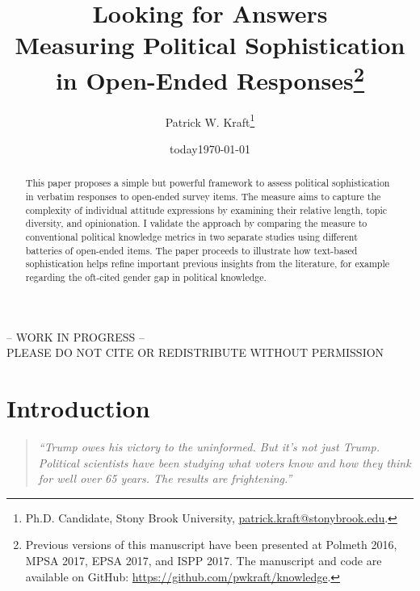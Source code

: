\documentclass[12pt]{article}
\author{Patrick W. Kraft\footnote{Ph.D. Candidate, Stony Brook University, \href{mailto:patrick.kraft@stonybrook.edu}{patrick.kraft@stonybrook.edu}.
}}
\date{today}
\title{Looking for Answers\\
\large{Measuring Political Sophistication in Open-Ended Responses}\footnote{Previous versions of this manuscript have been presented at Polmeth 2016, MPSA 2017, EPSA 2017, and ISPP 2017.
The manuscript and code are available on GitHub: \url{https://github.com/pwkraft/knowledge}.
}
}
\date{\today}
\begin{document}
\maketitle\doublespacing\thispagestyle{empty}

\begin{center}
-- WORK IN PROGRESS -- \\
PLEASE DO NOT CITE OR REDISTRIBUTE WITHOUT PERMISSION
\end{center} 

\hfill
\begin{abstract}\singlespacing
This paper proposes a simple but powerful framework to assess political sophistication in verbatim responses to open-ended survey items. The measure aims to capture the complexity of individual attitude expressions by examining their relative length, topic diversity, and opinionation. I validate the approach by comparing the measure to conventional political knowledge metrics in two separate studies using different batteries of open-ended items. The paper proceeds to illustrate how text-based sophistication helps refine important previous insights from the literature, for example regarding the oft-cited gender gap in political knowledge.


\end{abstract}
\hfill
\newpage\setcounter{page}{1}


\section*{Introduction}

\begin{quote}\singlespacing
\textit{``Trump owes his victory to the uninformed. But it's not just Trump. Political scientists have been studying what voters know and how they think for well over 65 years. The results are frightening.''}
\end{quote}
\end{document}
